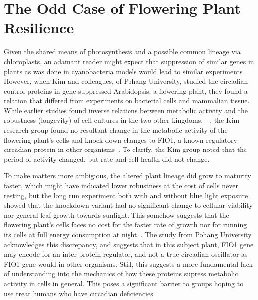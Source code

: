 \documentclass [12pt]{article}
\begin{document}
\section{The Odd Case of Flowering Plant Resilience}
	\indent Given the shared means of photosynthesis and a possible common lineage via chloroplasts, an adamant reader might expect that suppression of similar genes in plants as was done in cyanobacteria models would lead to similar experiments~\autocite{Cohen2015}. However, when Kim and colleagues, of Pohang University, studied the circadian control proteins in gene suppressed Arabidopsis,  a flowering plant, they found a relation that differed from experiments on bacterial cells and mammalian tissue. While earlier studies found inverse relations between metabolic activity and the robustness (longevity) of cell cultures in the two other kingdoms,~\autocite{Yamajuku2011}~\autocite{Osanai2014}, the Kim research group found no resultant change in the metabolic activity of the flowering plant's cells and knock down changes to FIO1, a known regulatory circadian protein in other organisms~\autocite{Kim2008}. To clarify, the Kim group noted that the period of activity changed, but rate and cell health did not change. \par
	\indent To make matters more ambigious, the altered plant lineage did grow to maturity faster, which might have indicated lower robustness at the cost of cells never resting, but the long run experiment both with and without blue light exposure showed that the knockdown variant had no significant change to cellular viability nor general leaf growth towards sunlight. This somehow suggests that the flowering plant's cells faces no cost for the faster rate of growth nor for running its cells at full energy consumption at night~\autocite{Kim2008}. The study from Pohang University acknowledges this discrepancy, and suggests that in this subject plant, FIO1 gene may encode for an inter-protein regulator, and not a true circadian oscillator as FIO1 gene would in other organisms. Still, this suggests a more fundamental lack of understanding into the mechanics of how these proteins supress metabolic activity in cells in general. This poses a significant barrier to groups hoping to use treat humans who have circadian deficiencies.
\newpage
\end{document}
